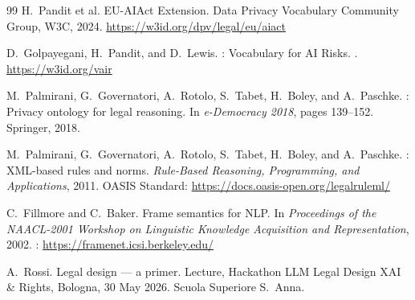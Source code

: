 \documentclass[12pt, a4paper]{article}
\begin{document}
\begin{thebibliography}{99}
H.\ Pandit et al.
 {EU-AIAct} Extension.
\newblock Data Privacy Vocabulary Community Group, W3C, 2024.
\newblock \url{https://w3id.org/dpv/legal/eu/aiact}

D.\ Golpayegani, H.\ Pandit, and D.\ Lewis.
: Vocabulary for {AI} Risks.
.
\newblock \url{https://w3id.org/vair}

M.\ Palmirani, G.\ Governatori, A.\ Rotolo, S.\ Tabet, H.\ Boley, and
A.\ Paschke.
: Privacy ontology for legal reasoning.
\newblock In \emph{e-Democracy 2018}, pages 139--152. Springer, 2018.

M.\ Palmirani, G.\ Governatori, A.\ Rotolo, S.\ Tabet, H.\ Boley, and
A.\ Paschke.
: {XML}-based rules and norms.
\newblock \emph{Rule-Based Reasoning, Programming, and Applications}, 2011.
\newblock OASIS Standard: \url{https://docs.oasis-open.org/legalruleml/}

C.\ Fillmore and C.\ Baker.
\newblock Frame semantics for {NLP}.
\newblock In \emph{Proceedings of the NAACL-2001 Workshop on Linguistic
Knowledge Acquisition and Representation}, 2002.
: \url{https://framenet.icsi.berkeley.edu/}

A.\ Rossi.
\newblock Legal design --- a primer.
\newblock Lecture, Hackathon LLM Legal Design XAI \& Rights, Bologna, 30 May
2026. Scuola Superiore S.\ Anna.

\end{thebibliography}
\end{document}

